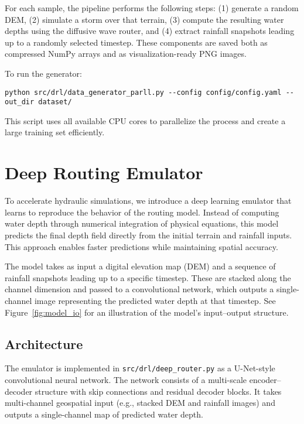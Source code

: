 \documentclass{article}
\begin{document}
For each sample, the pipeline performs the following steps: (1) generate a random DEM, (2) simulate a storm over that terrain, (3) compute the resulting water depths using the diffusive wave router, and (4) extract rainfall snapshots leading up to a randomly selected timestep. These components are saved both as compressed NumPy arrays and as visualization-ready PNG images.

To run the generator:
\begin{verbatim}
python src/drl/data_generator_parll.py --config config/config.yaml --out_dir dataset/
\end{verbatim}

This script uses all available CPU cores to parallelize the process and create a large training set efficiently.

\section{Deep Routing Emulator}
\label{sec:deeprouting}

To accelerate hydraulic simulations, we introduce a deep learning emulator that learns to reproduce the behavior of the routing model. Instead of computing water depth through numerical integration of physical equations, this model predicts the final depth field directly from the initial terrain and rainfall inputs. This approach enables faster predictions while maintaining spatial accuracy.

The model takes as input a digital elevation map (DEM) and a sequence of rainfall snapshots leading up to a specific timestep. These are stacked along the channel dimension and passed to a convolutional network, which outputs a single-channel image representing the predicted water depth at that timestep. See Figure~\ref{fig:model_io} for an illustration of the model's input–output structure.


\subsection{Architecture}
\label{sec:arch}

The emulator is implemented in \texttt{src/drl/deep\_router.py} as a U-Net-style convolutional neural network. The network consists of a multi-scale encoder–decoder structure with skip connections and residual decoder blocks. It takes multi-channel geospatial input (e.g., stacked DEM and rainfall images) and outputs a single-channel map of predicted water depth.
\end{document}
